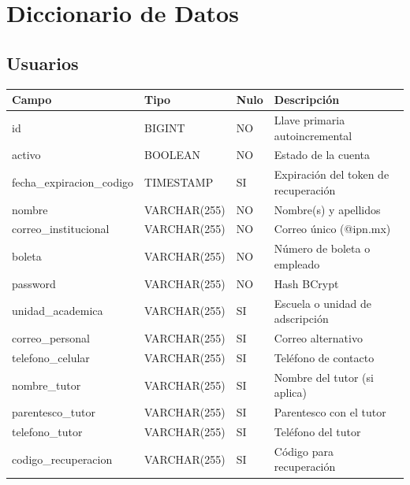 \documentclass[11pt,letterpaper]{article}
\begin{document}
\section{Diccionario de Datos}

\subsection{Usuarios}
\begin{longtable}{|p{4.2cm}|p{3.2cm}|p{2.2cm}|p{4.5cm}|}
\hline
\rowcolor{lightgray} \textbf{Campo} & \textbf{Tipo} & \textbf{Nulo} & \textbf{Descripción} \\
\hline
id & BIGINT & NO & Llave primaria autoincremental \\
\hline
activo & BOOLEAN & NO & Estado de la cuenta \\
\hline
fecha\_expiracion\_codigo & TIMESTAMP & SI & Expiración del token de recuperación \\
\hline
nombre & VARCHAR(255) & NO & Nombre(s) y apellidos \\
\hline
correo\_institucional & VARCHAR(255) & NO & Correo único (@ipn.mx) \\
\hline
boleta & VARCHAR(255) & NO & Número de boleta o empleado \\
\hline
password & VARCHAR(255) & NO & Hash BCrypt \\
\hline
unidad\_academica & VARCHAR(255) & SI & Escuela o unidad de adscripción \\
\hline
correo\_personal & VARCHAR(255) & SI & Correo alternativo \\
\hline
telefono\_celular & VARCHAR(255) & SI & Teléfono de contacto \\
\hline
nombre\_tutor & VARCHAR(255) & SI & Nombre del tutor (si aplica) \\
\hline
parentesco\_tutor & VARCHAR(255) & SI & Parentesco con el tutor \\
\hline
telefono\_tutor & VARCHAR(255) & SI & Teléfono del tutor \\
\hline
codigo\_recuperacion & VARCHAR(255) & SI & Código para recuperación \\
\hline
\end{longtable}
\end{document}

